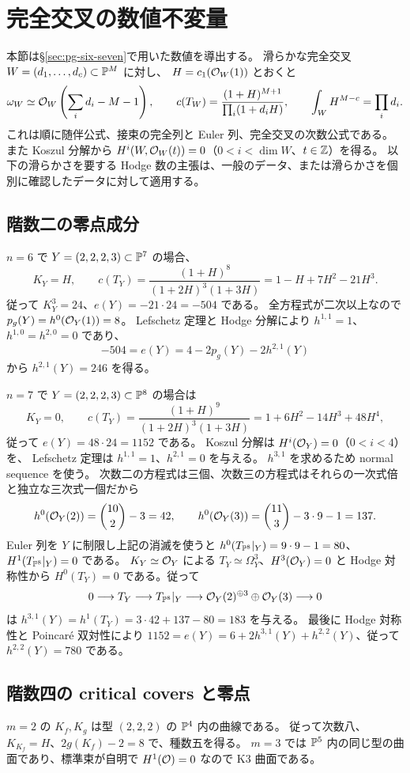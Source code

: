\section{完全交叉の数値不変量}\label{sec:pg-numerical}
本節は\S\ref{sec:pg-six-seven}で用いた数値を導出する。
滑らかな完全交叉 $W=(d_1,\ldots,d_c)\subset\mathbb P^M$ に対し、
$H=c_1(\mathcal O_W(1))$ とおくと
\begin{equation}\label{eq:pg-ci-formulas}
\omega_W\simeq\mathcal O_W\left(\sum_i d_i-M-1\right),\qquad
c(T_W)=\frac{(1+H)^{M+1}}{\prod_i(1+d_iH)},\qquad
\int_W H^{M-c}=\prod_i d_i.
\end{equation}
これは順に随伴公式、接束の完全列と Euler 列、完全交叉の次数公式である。
また Koszul 分解から
$H^i(W,\mathcal O_W(t))=0$（$0<i<\dim W$、$t\in\mathbb Z$）を得る。
以下の滑らかさを要する Hodge 数の主張は、一般のデータ、または滑らかさを個別に確認したデータに対して適用する。

\subsection{階数二の零点成分}
$n=6$ で $Y=(2,2,2,3)\subset\mathbb P^7$ の場合、
\[
K_Y=H,\qquad c(T_Y)=\frac{(1+H)^8}{(1+2H)^3(1+3H)}
=1-H+7H^2-21H^3.
\]
従って $K_Y^3=24$、$e(Y)=-21\cdot24=-504$ である。
全方程式が二次以上なので $p_g(Y)=h^0(\mathcal O_Y(1))=8$。
Lefschetz 定理と Hodge 分解により
$h^{1,1}=1$、$h^{1,0}=h^{2,0}=0$ であり、
\[
-504=e(Y)=4-2p_g(Y)-2h^{2,1}(Y)
\]
から $h^{2,1}(Y)=246$ を得る。

$n=7$ で $Y=(2,2,2,3)\subset\mathbb P^8$ の場合は
\[
K_Y=0,\qquad c(T_Y)=\frac{(1+H)^9}{(1+2H)^3(1+3H)}
=1+6H^2-14H^3+48H^4,
\]
従って $e(Y)=48\cdot24=1152$ である。
Koszul 分解は $H^i(\mathcal O_Y)=0$（$0<i<4$）を、
Lefschetz 定理は $h^{1,1}=1$、$h^{2,1}=0$ を与える。
$h^{3,1}$ を求めるため normal sequence を使う。
次数二の方程式は三個、次数三の方程式はそれらの一次式倍と独立な三次式一個だから
\[
h^0(\mathcal O_Y(2))=\binom{10}{2}-3=42,\qquad
h^0(\mathcal O_Y(3))=\binom{11}{3}-3\cdot9-1=137.
\]
Euler 列を $Y$ に制限し上記の消滅を使うと
$h^0(T_{\mathbb P^8}|_Y)=9\cdot9-1=80$、$H^1(T_{\mathbb P^8}|_Y)=0$ である。
$K_Y\simeq\mathcal O_Y$ による $T_Y\simeq\Omega_Y^3$、$H^3(\mathcal O_Y)=0$ と Hodge 対称性から
$H^0(T_Y)=0$ である。従って
\[
0\longrightarrow T_Y\longrightarrow T_{\mathbb P^8}|_Y
\longrightarrow\mathcal O_Y(2)^{\oplus3}\oplus\mathcal O_Y(3)\longrightarrow0
\]
は $h^{3,1}(Y)=h^1(T_Y)=3\cdot42+137-80=183$ を与える。
最後に Hodge 対称性と Poincar\'e 双対性により
$1152=e(Y)=6+2h^{3,1}(Y)+h^{2,2}(Y)$、従って $h^{2,2}(Y)=780$ である。

\subsection{階数四の critical covers と零点}
$m=2$ の $K_f,K_g$ は型 $(2,2,2)$ の $\mathbb P^4$ 内の曲線である。
従って次数八、$K_{K_f}=H$、$2g(K_f)-2=8$ で、種数五を得る。
$m=3$ では $\mathbb P^5$ 内の同じ型の曲面であり、標準束が自明で $H^1(\mathcal O)=0$ なので K3 曲面である。

